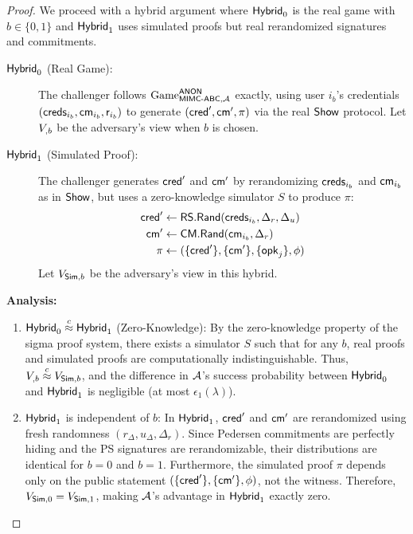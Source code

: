 \begin{proof}
    We proceed with a hybrid argument where $\mathsf{Hybrid}_0$ is the real game with $b \in \{0, 1\}$ and $\mathsf{Hybrid}_1$ uses simulated proofs but real rerandomized signatures and commitments.
    
    \begin{description}
        \item[$\mathsf{Hybrid}_0$ (Real Game):] The challenger follows $\mathrm{Game}_{\mathsf{MIMC\text{-}ABC},\mathcal{A}}^{\mathsf{ANON}}$ exactly, using user $i_b$'s credentials $(\mathsf{creds}_{i_b}, \mathsf{cm}_{i_b}, \mathsf{r}_{i_b})$ to generate $(\mathsf{cred}', \mathsf{cm}', \pi)$ via the real $\mathsf{Show}$ protocol. Let $V_{\real,b}$ be the adversary's view when $b$ is chosen.
        
        \item[$\mathsf{Hybrid}_1$ (Simulated Proof):] The challenger generates $\mathsf{cred}'$ and $\mathsf{cm}'$ by rerandomizing $\mathsf{creds}_{i_b}$ and $\mathsf{cm}_{i_b}$ as in $\mathsf{Show}$, but uses a zero-knowledge simulator $S$ to produce $\pi$:
        \begin{align*}
            \mathsf{cred}' &\leftarrow \mathsf{RS.Rand}(\mathsf{creds}_{i_b}, \Delta_r, \Delta_u)\\
            \mathsf{cm}' &\leftarrow \mathsf{CM.Rand}(\mathsf{cm}_{i_b}, \Delta_r)\\
            \pi &\leftarrow (\{\mathsf{cred}'\}, \{\mathsf{cm}'\}, \{ \mathsf{opk}_j \}, \phi)
        \end{align*}
        Let $V_{\mathsf{Sim},b}$ be the adversary's view in this hybrid.
    \end{description}
    
    \textbf{Analysis:}
    \begin{enumerate}
        \item $\mathsf{Hybrid}_0 \stackrel{c}{\approx} \mathsf{Hybrid}_1$ (Zero-Knowledge): By the zero-knowledge property of the sigma proof system, there exists a simulator $S$ such that for any $b$, real proofs and simulated proofs are computationally indistinguishable. Thus, $V_{\real,b} \stackrel{c}{\approx} V_{\Sim,b}$, and the difference in $\mathcal{A}$'s success probability between $\mathsf{Hybrid}_0$ and $\mathsf{Hybrid}_1$ is negligible (at most $\epsilon_1(\lambda)$).
        
        \item $\mathsf{Hybrid}_1$ is independent of $b$: In $\mathsf{Hybrid}_1$, $\mathsf{cred}'$ and $\mathsf{cm}'$ are rerandomized using fresh randomness $(r_\Delta, u_\Delta, \Delta_r)$. Since Pedersen commitments are perfectly hiding and the PS signatures are rerandomizable, their distributions are identical for $b = 0$ and $b = 1$. Furthermore, the simulated proof $\pi$ depends only on the public statement $(\{\mathsf{cred}'\}, \{\mathsf{cm}'\}, \phi)$, not the witness. Therefore, $V_{\mathsf{Sim},0} = V_{\mathsf{Sim},1}$, making $\mathcal{A}$'s advantage in $\mathsf{Hybrid}_1$ exactly zero.
    \end{enumerate}
    

\end{proof}
